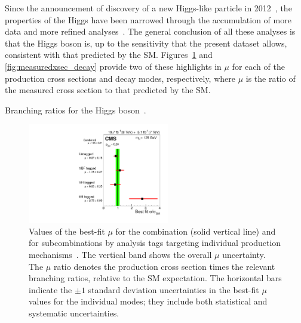 Since the announcement of discovery of a new Higgs-like particle
in 2012~\cite{higgsdiscoveryAtlas,Chatrchyan:2012ufa}, the properties of the Higgs have been narrowed
through the accumulation of more data and more refined analyses~\cite{Hdiscovery}. The general
conclusion of all these analyses is that the Higgs boson is, up to the sensitivity that the present
dataset allows, consistent with that predicted by the SM. Figures~\ref{fig:measuredxsec_prod} and
\ref{fig:measuredxsec_decay} provide two of these highlights in $\mu$ for each of the
production cross sections and decay modes, respectively, where $\mu$ is the
ratio of the measured cross section to that predicted by the SM.

\begin{table}[ht]
  \centering
  \renewcommand{\arraystretch}{1.4}
  \caption{Branching ratios for the Higgs boson~\cite{LHC:SMHiggsBR}.}
  
  \label{table:BR_SMhiggs}
\end{table}

\begin{figure}[ht]
 \begin{center}
    \includegraphics[width=0.55\textwidth]{figures/intro/sqr_mlz_ccc_mH125_prod.pdf}
      \end{center}
\caption{Values of the best-fit $\mu$ for the combination (solid vertical line) and for
subcombinations by analysis tags targeting individual production mechanisms~\cite{Khachatryan:1979247}.
The vertical band shows the overall $\mu$ uncertainty. The $\mu$ ratio denotes the production cross section times the relevant branching ratios, relative to the SM expectation. The horizontal bars indicate the $\pm 1$ standard deviation uncertainties in the best-fit $\mu$ values for the individual modes; they include both statistical and systematic uncertainties.}
\label{fig:measuredxsec_prod}
\end{figure}

